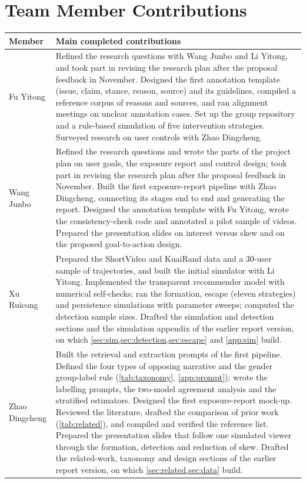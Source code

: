 \section{Team Member Contributions}
\label{sec:contrib}

\begin{table}[H]
\centering\small
\begin{tabularx}{\textwidth}{@{}L{2.35cm} Y@{}}
\toprule
Member & Main completed contributions\\
\midrule
Fu Yitong & Refined the research questions with Wang Junbo and Li Yitong, and took part in revising the research plan after the proposal feedback in November. Designed the first annotation template (issue, claim, stance, reason, source) and its guidelines, compiled a reference corpus of reasons and sources, and ran alignment meetings on unclear annotation cases. Set up the group repository and a rule-based simulation of five intervention strategies. Surveyed research on user controls with Zhao Dingcheng.\\
\addlinespace
Wang Junbo & Refined the research questions and wrote the parts of the project plan on user goals, the exposure report and control design; took part in revising the research plan after the proposal feedback in November. Built the first exposure-report pipeline with Zhao Dingcheng, connecting its stages end to end and generating the report. Designed the annotation template with Fu Yitong, wrote the consistency-check code and annotated a pilot sample of videos. Prepared the presentation slides on interest versus skew and on the proposed goal-to-action design.\\
\addlinespace
Xu Ruicong & Prepared the ShortVideo and KuaiRand data and a 30-user sample of trajectories, and built the initial simulator with Li Yitong. Implemented the transparent recommender model with numerical self-checks; ran the formation, escape (eleven strategies) and persistence simulations with parameter sweeps; computed the detection sample sizes. Drafted the simulation and detection sections and the simulation appendix of the earlier report version, on which \cref{sec:sim,sec:detection,sec:escape} and \cref{app:sim} build.\\
\addlinespace
Zhao Dingcheng & Built the retrieval and extraction prompts of the first pipeline. Defined the four types of opposing narrative and the gender group-label rule (\cref{tab:taxonomy}, \cref{app:prompt}); wrote the labelling prompts, the two-model agreement analysis and the stratified estimators. Designed the first exposure-report mock-up. Reviewed the literature, drafted the comparison of prior work (\cref{tab:related}), and compiled and verified the reference list. Prepared the presentation slides that follow one simulated viewer through the formation, detection and reduction of skew. Drafted the related-work, taxonomy and design sections of the earlier report version, on which \cref{sec:related,sec:data} build.\\

\end{tabularx}
\end{table}
